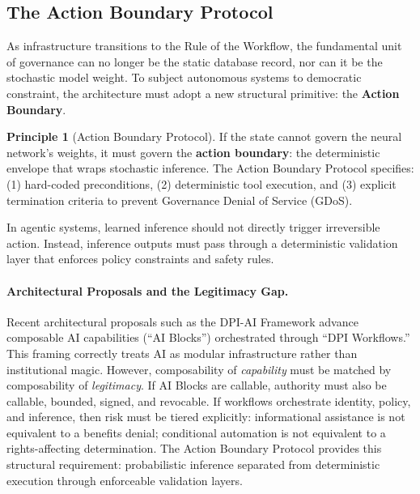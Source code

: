 \documentclass[11pt,a4paper]{article}
\theoremstyle{definition}
\newtheorem{principle}{Principle}[section]
\begin{document}
\subsection{The Action Boundary Protocol}
\label{subsec:action-boundary}

As infrastructure transitions to the Rule of the Workflow, the fundamental unit of governance can no longer be the static database record, nor can it be the stochastic model weight. To subject autonomous systems to democratic constraint, the architecture must adopt a new structural primitive: the \textbf{Action Boundary}.

\begin{principle}[Action Boundary Protocol]
If the state cannot govern the neural network's weights, it must govern the \textbf{action boundary}: the deterministic envelope that wraps stochastic inference. The Action Boundary Protocol specifies: (1) hard-coded preconditions, (2) deterministic tool execution, and (3) explicit termination criteria to prevent Governance Denial of Service (GDoS).
\end{principle}

In agentic systems, learned inference should not directly trigger irreversible action. Instead, inference outputs must pass through a deterministic validation layer that enforces policy constraints and safety rules.

\paragraph{Architectural Proposals and the Legitimacy Gap.} Recent architectural proposals such as the DPI-AI Framework \citep{abadie2026} advance composable AI capabilities (``AI Blocks'') orchestrated through ``DPI Workflows.'' This framing correctly treats AI as modular infrastructure rather than institutional magic. However, composability of \textit{capability} must be matched by composability of \textit{legitimacy}. If AI Blocks are callable, authority must also be callable, bounded, signed, and revocable. If workflows orchestrate identity, policy, and inference, then risk must be tiered explicitly: informational assistance is not equivalent to a benefits denial; conditional automation is not equivalent to a rights-affecting determination. The Action Boundary Protocol provides this structural requirement: probabilistic inference separated from deterministic execution through enforceable validation layers.
\end{document}
